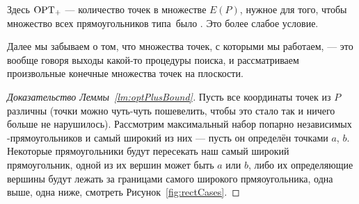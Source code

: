 \documentclass[a4paper,11pt]{article}
\begin{document}
Здесь $\operatorname{OPT}_+$ — количество точек в множестве $E(P)$, нужное для того, чтобы множество всех прямоугольников типа~\tpl было \arbs. Это более слабое условие.

Далее мы забываем о том, что множества точек, с которыми мы работаем, — это вообще говоря выходы какой-то процедуры поиска, и рассматриваем произвольные конечные множества точек на плоскости.

\begin{proof}[Доказательство Леммы~\ref{lm:optPlusBound}]
Пусть все координаты точек из $P$ различны (точки можно чуть-чуть пошевелить, чтобы это стало так и ничего больше не нарушилось). Рассмотрим максимальный набор попарно независимых \tpl-прямоугольников и самый широкий из них — пусть он определён точками $a$, $b$. Некоторые прямоугольники будут пересекать наш самый широкий прямоугольник, одной из их вершин может быть $a$ или $b$, либо их определяющие вершины будут лежать за границами самого широкого прмяоугольника, одна выше, одна ниже, смотреть Рисунок~\ref{fig:rectCases}.



\end{proof}
\end{document}
